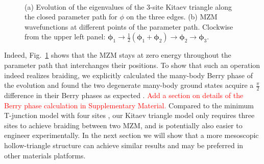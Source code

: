 \documentclass[aps,prb,showpacs,amsmath,twocolumn,amssymb,superscriptaddress]{revtex4-2}
\newcommand{\Red}[1]{\textcolor{red}{#1}}
\begin{document}
\begin{figure}[ht]
	\centering
  \hspace{-18pt}
  \\
	\caption{(a) Evolution of the eigenvalues of the 3-site Kitaev triangle along the closed parameter path for $\phi$ on the three edges. (b) MZM wavefunctions at different points of the parameter path. Clockwise from the upper left panel: $\bm \phi_1 \rightarrow \frac{1}{2}(\bm \phi_1 + \bm \phi_2)\rightarrow \bm \phi_2\rightarrow \bm \phi_3$.}
	\label{fig:3eig}
\end{figure}

Indeed, Fig.~\ref{fig:3eig} shows that the MZM stays at zero energy throughout the parameter path that interchanges their positions. To show that such an operation indeed realizes braiding, we explicitly calculated the many-body Berry phase of the evolution \cite{supp,aliceaNonAbelianStatisticsTopological2011,liManipulatingMajoranaZero2016} and found the two degenerate many-body ground states acquire a $\frac{\pi}{2}$ difference in their Berry phases as expected \cite{aliceaNonAbelianStatisticsTopological2011}. \Red{Add a section on details of the Berry phase calculation in Supplementary Material.} Compared to the minimum T-junction model with four sites \cite{aliceaNonAbelianStatisticsTopological2011}, our Kitaev triangle model only requires three sites to achieve braiding between two MZM, and is potentially also easier to engineer experimentally. In the next section we will show that a more mesoscopic hollow-triangle structure can achieve similar results and may be preferred in other materials platforms.
\end{document}

